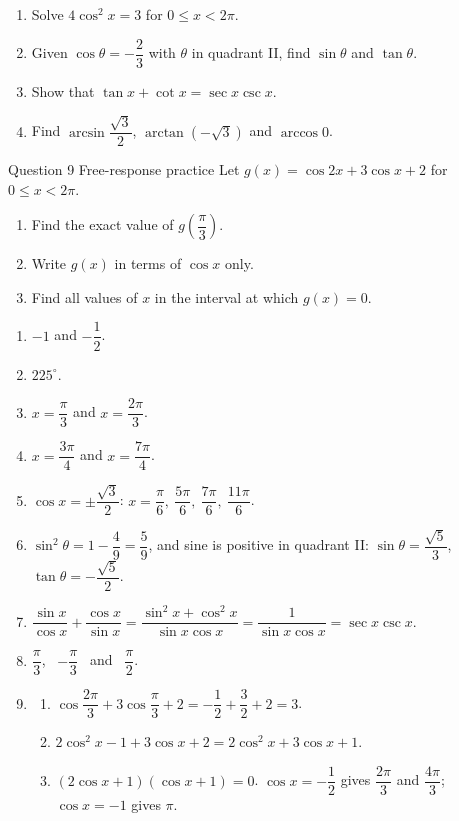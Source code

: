 \documentclass[11pt]{article}
\begin{document}
\begin{enumerate}[leftmargin=*,itemsep=2pt,start=5]
  \item Solve $4\cos^2x=3$ for $0\le x<2\pi$.\work{2.8cm}
  \item Given $\cos\theta=-\dfrac23$ with $\theta$ in quadrant II, find $\sin\theta$ and $\tan\theta$.\work{2.8cm}
  \item Show that $\tan x+\cot x=\sec x\csc x$.\work{2.8cm}
  \item Find $\arcsin\dfrac{\sqrt3}{2}$, $\arctan\!\left(-\sqrt3\right)$ and $\arccos0$.\work{2.8cm}
\end{enumerate}

\begin{frbox}{Question 9 \textperiodcentered{} Free-response practice}
Let $g(x)=\cos2x+3\cos x+2$ for $0\le x<2\pi$.
\begin{enumerate}[label=(\alph*),leftmargin=*,itemsep=2pt]
  \item Find the exact value of $g\!\left(\dfrac\pi3\right)$.\work{2.6cm}
  \item Write $g(x)$ in terms of $\cos x$ only.\work{2.6cm}
  \item Find all values of $x$ in the interval at which $g(x)=0$.\work{2.6cm}
\end{enumerate}
\end{frbox}

\newpage
\begin{solbox}
\begin{enumerate}[leftmargin=*,itemsep=4pt]
  \item $-1$ and $-\dfrac12$.
  \item $225^\circ$.
  \item $x=\dfrac\pi3$ and $x=\dfrac{2\pi}{3}$.
  \item $x=\dfrac{3\pi}{4}$ and $x=\dfrac{7\pi}{4}$.
  \item $\cos x=\pm\dfrac{\sqrt3}{2}$: $x=\dfrac\pi6,\ \dfrac{5\pi}{6},\ \dfrac{7\pi}{6},\ \dfrac{11\pi}{6}$.
  \item $\sin^2\theta=1-\dfrac49=\dfrac59$, and sine is positive in quadrant II: $\sin\theta=\dfrac{\sqrt5}{3}$, $\tan\theta=-\dfrac{\sqrt5}{2}$.
  \item $\dfrac{\sin x}{\cos x}+\dfrac{\cos x}{\sin x}=\dfrac{\sin^2x+\cos^2x}{\sin x\cos x}=\dfrac{1}{\sin x\cos x}=\sec x\csc x$.
  \item $\dfrac\pi3$, \ $-\dfrac\pi3$ \ and \ $\dfrac\pi2$.
  \item \begin{enumerate}[label=(\alph*),leftmargin=*,itemsep=3pt]
    \item $\cos\dfrac{2\pi}{3}+3\cos\dfrac\pi3+2=-\dfrac12+\dfrac32+2=3$.
    \item $2\cos^2x-1+3\cos x+2=2\cos^2x+3\cos x+1$.
    \item $(2\cos x+1)(\cos x+1)=0$. $\cos x=-\dfrac12$ gives $\dfrac{2\pi}{3}$ and $\dfrac{4\pi}{3}$; $\cos x=-1$ gives $\pi$.
  \end{enumerate}
\end{enumerate}
\end{solbox}
\end{document}
